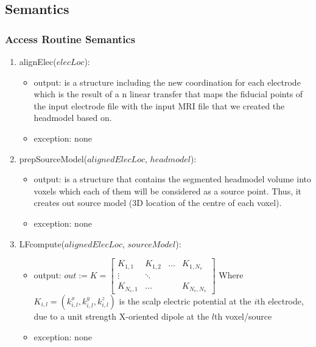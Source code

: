 \documentclass[12pt, titlepage]{article}
\begin{document}
\subsection{Semantics}

\subsubsection{Access Routine Semantics}

\begin{enumerate}

\item alignElec($elecLoc$):
\begin{itemize}
\item output: is a structure including the new coordination for each electrode which is the result of a n linear transfer that maps the fiducial points of the input electrode file with the input MRI file that we created the headmodel based on.
\item exception: none
\end{itemize}

\item prepSourceModel($alignedElecLoc$, $headmodel$):
\begin{itemize}
\item output: is a structure that contains the segmented headmodel volume into voxels which each of them will be considered as a source point. Thus, it creates out source model (3D location of the centre of each voxel).
\item exception: none
\end{itemize}

\item LFcompute($alignedElecLoc$, $sourceModel$):
\begin{itemize}
\item output: $out := 
K = \begin{bmatrix} 
    K_{1,1} & K_{1,2} & \dots & K_{1,N_v} \\
    \vdots & \ddots & \\
    K_{N_e, 1} &       \dots &  & K_{N_e, N_v}
    \end{bmatrix}
$
Where $K_{i,l} = (k^x_{i,l}, k^y_{i,l}, k^z_{i,l})$
is the scalp electric potential at the $i$th electrode, due to a unit strength X-oriented dipole at the $l$th voxel/source\\

\item exception: none
\end{itemize}

\end{enumerate}
\end{document}
